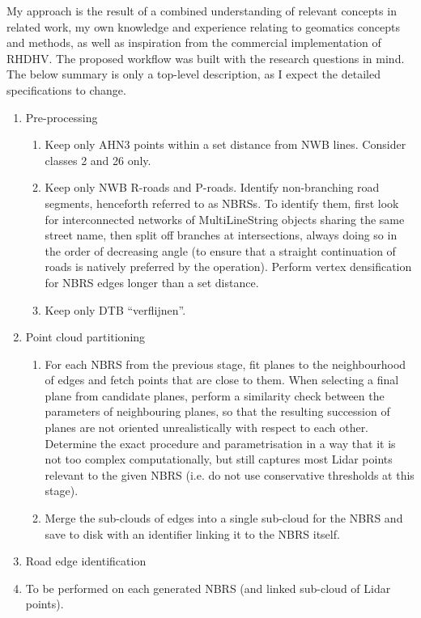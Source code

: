 My approach is the result of a combined understanding of relevant concepts in related work, my own knowledge and experience relating to geomatics concepts and methods, as well as inspiration from the commercial implementation of RHDHV. The proposed workflow was built with the research questions in mind. The below summary is only a top-level description, as I expect the detailed specifications to change.

\begin{enumerate}
    \item Pre-processing
    \begin{enumerate}
        \item Keep only AHN3 points within a set distance from NWB lines. Consider classes 2 and 26 only.
        \item Keep only NWB R-roads and P-roads. Identify non-branching road segments, henceforth referred to as NBRSs. To identify them, first look for interconnected networks of MultiLineString objects sharing the same street name, then split off branches at intersections, always doing so in the order of decreasing angle (to ensure that a straight continuation of roads is natively preferred by the operation). Perform vertex densification for NBRS edges longer than a set distance.
        \item Keep only DTB “verflijnen”.
    \end{enumerate}
    \item Point cloud partitioning
    \begin{enumerate}
        \item For each NBRS from the previous stage, fit planes  to the neighbourhood of edges  and fetch  points that are close to them. When selecting a final plane from candidate planes, perform a similarity check between the parameters of neighbouring planes, so that the resulting succession of planes are not oriented unrealistically with respect to each other. Determine the exact procedure and parametrisation in a way that it is not too complex computationally, but still captures most Lidar points relevant to the given NBRS (i.e. do not use conservative thresholds at this stage).
        \item Merge the sub-clouds of edges into a single sub-cloud for the NBRS and save to disk with an identifier linking it to the NBRS itself.
    \end{enumerate}
    \item Road edge identification
    \item[] To be performed on each generated NBRS (and linked sub-cloud of Lidar points).

\end{enumerate}
